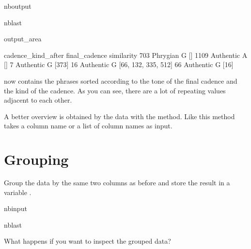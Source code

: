 \documentclass[letterpaper,10pt,english]{sphinxmanual}
\begin{document}
\begin{sphinxuseclass}{nboutput}
\begin{sphinxuseclass}{nblast}
{\begin{sphinxuseclass}{output_area}
\begin{sphinxuseclass}{}
\begin{sphinxVerbatim}[commandchars=\\\{\}]
     cadence\_kind\_after final\_cadence           similarity
703            Phrygian             G                   []
1109          Authentic             A                   []
7             Authentic             G                [373]
16            Authentic             G  [66, 132, 335, 512]
66            Authentic             G                 [16]
\end{sphinxVerbatim}



\end{sphinxuseclass}
\end{sphinxuseclass}
}

\end{sphinxuseclass}
\end{sphinxuseclass}
\sphinxAtStartPar
{} now contains the phrases sorted according to the tone of the final cadence and the kind of the cadence. As you can see, there are a lot of repeating values adjacent to each other.

\sphinxAtStartPar
A better overview is obtained by  the data with the  method. Like  this method takes a column name or a list of column names as input.


\section{Grouping}
\label{\detokenize{exercises/02_exercise:Grouping}}
\sphinxAtStartPar
Group the data by the same two columns as before and store the result in a variable .

\begin{sphinxuseclass}{nbinput}
\begin{sphinxuseclass}{nblast}
{
\begin{sphinxVerbatim}[commandchars=\\\{\}]
\llap{\color{nbsphinxin}[24]:\,\hspace{\fboxrule}\hspace{\fboxsep}}  \PYG{p}{[} \PYG{p}{]}
\end{sphinxVerbatim}
}

\end{sphinxuseclass}
\end{sphinxuseclass}
\sphinxAtStartPar
What happens if you want to inspect the grouped data?
\end{document}
